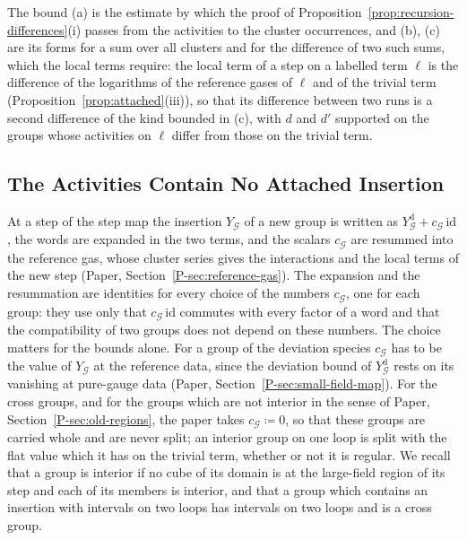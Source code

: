 \documentclass[11pt]{preprint}
\numberwithin{equation}{section}
\theoremstyle{definition}
\theoremstyle{remark}
\theoremstyle{plain}
\begin{document}
The bound (a) is the estimate by which the proof of Proposition~\ref{prop:recursion-differences}(i) passes from the activities to the cluster occurrences, and (b), (c) are its forms for a sum over all clusters and for the difference of two such sums, which the local terms require: the local term of a step on a labelled term $\ell$ is the difference of the logarithms of the reference gases of $\ell$ and of the trivial term (Proposition~\ref{prop:attached}(iii)), so that its difference between two runs is a second difference of the kind bounded in (c), with $d$ and $d'$ supported on the groups whose activities on $\ell$ differ from those on the trivial term.

\subsection{The Activities Contain No Attached Insertion}

At a step of the step map the insertion $Y_{\mathcal G}$ of a new group is written as $Y^{\mathrm d}_{\mathcal G} + c_{\mathcal G}\,\mathrm{id}$, the words are expanded in the two terms, and the scalars $c_{\mathcal G}$ are resummed into the reference gas, whose cluster series gives the interactions and the local terms of the new step (Paper, Section~\ref{P-sec:reference-gas}). The expansion and the resummation are identities for every choice of the numbers $c_{\mathcal G}$, one for each group: they use only that $c_{\mathcal G}\,\mathrm{id}$ commutes with every factor of a word and that the compatibility of two groups does not depend on these numbers. The choice matters for the bounds alone. For a group of the deviation species $c_{\mathcal G}$ has to be the value of $Y_{\mathcal G}$ at the reference data, since the deviation bound of $Y^{\mathrm d}_{\mathcal G}$ rests on its vanishing at pure-gauge data (Paper, Section~\ref{P-sec:small-field-map}). For the cross groups, and for the groups which are not interior in the sense of Paper, Section~\ref{P-sec:old-regions}, the paper takes $c_{\mathcal G} \coloneqq 0$, so that these groups are carried whole and are never split; an interior group on one loop is split with the flat value which it has on the trivial term, whether or not it is regular. We recall that a group is interior if no cube of its domain is at the large-field region of its step and each of its members is interior, and that a group which contains an insertion with intervals on two loops has intervals on two loops and is a cross group.
\end{document}
